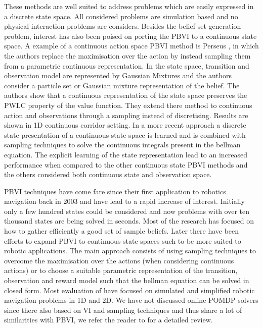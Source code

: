 These methods are well suited to address problems which are easily expressed in a discrete state space. All considered problems are simulation based and 
no physical interaction problems are considers. Besides the belief set generation problem, interest has also been poised on porting the PBVI to a continuous state space.
A example of a continuous action space PBVI method is Perseus \cite{Spaan05icra}, in which the authors replace the maximisation over the action by instead sampling them from a 
parametric continuous representation. In \cite{PBVI_C_2006} the state space, transition and observation model are represented by Gaussian Mixtures and the authors consider a particle 
set or Gaussian mixture representation of the belief. The authors show that a continuous representation of the state space preserves the PWLC property of the value function. They extend 
there method to continuous action and observations through a sampling instead of discretising. Results are shown in 1D continuous corridor setting. In a 
more recent approach \cite{solving_continous_pomdps_2013} a discrete state presentation of a continuous state space is learned and is combined with sampling
techniques to solve the continuous integrals present in the bellman equation. The explicit learning of the state representation lead to an increased performance
when compared to the other continuous state PBVI methods and the others considered both continuous state and observation space. 

PBVI techniques have come fare since their first application to robotics navigation back in 2003 and have lead to a rapid increase of interest. 
Initially only a few hundred states could be considered and now problems with over ten thousand states are being solved in seconds. 
Most of the research has focused on how to gather efficiently a good set of sample beliefs. Later there have been efforts to expand PBVI 
to continuous state spaces such to be more suited to robotic applications. The main approach consists of using sampling techniques to overcome 
the maximisation over the actions (when considering continuous actions) or to choose a suitable parametric representation of the transition, observation 
and reward model such that the bellman equation can be solved in closed form. Most evaluation of have focused on simulated and simplified robotic 
navigation problems in 1D and 2D. We have not discussed online POMDP-solvers since there also based on VI and sampling techniques and thus share 
a lot of similarities with PBVI, we refer the reader to \cite{Ross08onlineplanning} for a detailed review.

